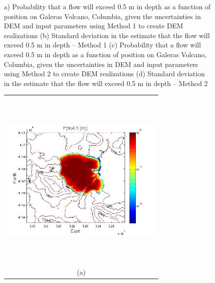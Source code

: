 \documentclass[12pt]{article}
\newcommand{\Pic}[2][0.85]{\begin{center}\texttt{[image: \#2]}
 \end{center} }
\begin{document}
\begin{figure}[H]
\begin{minipage}{0.6\textwidth}
    \end{minipage} 
    \caption{a) Probability that a flow will exceed 0.5 m in depth as
      a function of position on Galeras Volcano, Columbia, given the
      uncertainties in DEM and input parameters using Method 1 to
      create DEM realizations (b) Standard deviation in the estimate
      that the flow will exceed 0.5 m in depth -- Method 1 (c)
      Probability that a flow will exceed 0.5 m in depth as a function
      of position on Galeras Volcano, Columbia, given the
      uncertainties in DEM and input parameters using Method 2 to
      create DEM realizations (d) Standard deviation in the estimate
      that the flow will exceed 0.5 m in depth -- Method 2}
\label{fig3}  
\end{figure}

\begin{figure}[H]
    \begin{minipage}[b]{0.6\textwidth}
        \begin{tabular}{c}
       \includegraphics[width=8cm,height=9cm,keepaspectratio]{Mammoth_0_P_5m.jpg}\\
        (a)
        \end{tabular}
    \end{minipage}
    \begin{minipage}{0.6\textwidth}
        \begin{tabular}{c}

\end{tabular}
\end{minipage}
\end{figure}
\end{document}
